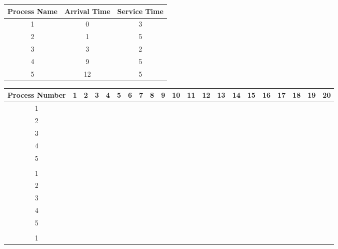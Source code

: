 \documentclass{article}
\newcommand{\generateHeader}{
\hline
Process Number & 1 & 2 & 3 & 4 & 5 & 6 & 7 & 8 & 9 & 10 & 11 & 12 & 13 & 14 & 15 & 16 & 17 & 18 & 19 & 20\\
\hline
}
\newcommand{\bc}{\cellcolor{blue!60}}
\newcommand{\blackc}{\cellcolor{black!}}
\newcommand{\blackrow}{
\blackc & \blackc & \blackc & \blackc & \blackc & \blackc & \blackc & \blackc & \blackc & \blackc & \blackc & \blackc & \blackc & \blackc & \blackc & \blackc & \blackc & \blackc & \blackc & \blackc & \blackc\\
\hline
}
\begin{document}
\begin{center}
\begin{tabular}{|c|c|c|}
\hline
Process Name & Arrival Time & Service Time\\
\hline
1 & 0 & 3\\
\hline
2 & 1 & 5\\
\hline
3 & 3 & 2\\
\hline
4 & 9 & 5\\
\hline
5 & 12 & 5\\
\hline
\end{tabular}

\vspace{0.5cm}

\begin{tabular}{|c|c|c|c|c|c|c|c|c|c|c|c|c|c|c|c|c|c|c|c|c|}
\generateHeader
1    &\bc    &\bc    &\bc    &    &    &    &    &    &    &    &    &    &    &    &    &    &    &    &    &\\
\hline
2    &    &    &    &\bc    &\bc    &\bc    &\bc    &\bc    &    &    &    &    &    &    &    &    &    &    &    &\\
\hline
3     &     &     &    &    &    &    &    &    &\bc    &\bc    &    &    &    &    &    &    &    &    &    &\\
\hline
4    &    &    &    &    &    &    &    &    &    &    &\bc    &\bc    &\bc    &\bc    &\bc    &    &    &    &    &\\
\hline
5    &    &    &    &    &    &    &    &    &    &    &    &    &    &    &    &\bc    &\bc    &\bc    &\bc    &\bc\\
\hline
\blackrow
1    &\bc    &    &\bc    &    &    &\bc    &    &    &    &    &    &    &    &    &    &    &    &    &    &\\
\hline
2    &    &\bc    &    &\bc    &    &    &\bc    &    &\bc    &    &\bc    &    &    &    &    &    &    &    &    &\\
\hline
3    &    &    &    &    &\bc    &    &    &\bc    &    &    &    &    &    &    &    &    &    &    &    &\\
\hline
4    &    &    &    &    &    &    &    &    &    &\bc    &    &\bc    &    &\bc    &    &\bc    &    &\bc    &    &\\
\hline
5    &    &    &    &    &    &    &    &    &    &    &    &    &\bc    &    &\bc    &    &\bc    &    &\bc    &\bc\\
\hline
\blackrow
1    &\bc    &\bc    &\bc    &    &    &    &    &    &    &    &    &    &    &    &    &    &    &    &    &\\

\end{tabular}
\end{center}
\end{document}
